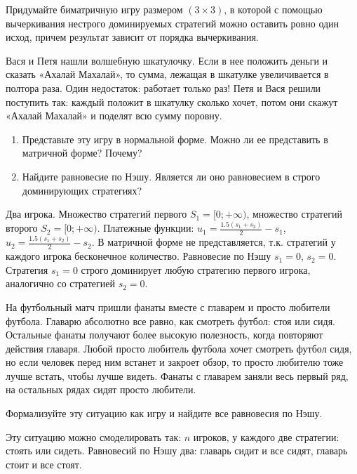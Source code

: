 \begin{problem}[Конструктор-3]
Придумайте биматричную игру размером  $\left(3\times 3\right)$, в которой с помощью вычеркивания нестрого доминируемых стратегий можно оставить ровно один исход, причем результат зависит от порядка вычеркивания.\par
\begin{sol}
\end{sol}
\end{problem}

\begin{problem}
Вася и Петя нашли волшебную шкатулочку. Если в нее положить деньги и сказать «Ахалай Махалай», то сумма, лежащая в шкатулке увеличивается в полтора раза. Один недостаток: работает только раз! Петя и Вася решили поступить так: каждый положит в шкатулку сколько хочет, потом они скажут «Ахалай Махалай» и поделят всю сумму поровну.\par
\begin{enumerate}
\item 	Представьте эту игру в нормальной форме. Можно ли ее представить в матричной форме? Почему?\par
\item 	Найдите равновесие по Нэшу. Является ли оно равновесием в строго доминирующих стратегиях?
\end{enumerate}



\begin{sol}
Два игрока. Множество стратегий первого $S_{1}=[0;+\infty)$, множество стратегий второго $S_{2}=[0;+\infty)$. Платежные функции: $u_{1}=\frac{1.5(s_{1}+s_{2})}{2}-s_{1}$,  $u_{2}=\frac{1.5(s_{1}+s_{2})}{2}-s_{2}$. В матричной форме не представляется, т.к. стратегий у каждого игрока бесконечное количество. Равновесие по Нэшу $s_{1}=0$, $s_{2}=0$. Стратегия $s_{1}=0$ строго доминирует любую стратегию первого игрока, аналогично со стратегией $s_{2}=0$.
\end{sol}
\end{problem}

\begin{problem}
На футбольный матч пришли фанаты вместе с главарем и просто любители футбола. Главарю абсолютно все равно, как смотреть футбол: стоя или сидя. Остальные фанаты получают более высокую полезность, когда повторяют действия главаря. Любой просто любитель футбола хочет смотреть футбол сидя, но если человек перед ним встанет и закроет обзор, то просто любителю тоже лучше встать, чтобы лучше видеть. Фанаты с главарем заняли весь первый ряд, на остальных рядах сидят просто любители.\par

Формализуйте эту ситуацию как игру и найдите все равновесия по Нэшу.

\begin{sol}
Эту ситуацию можно смоделировать так: $n$ игроков, у каждого две стратегии: стоять или сидеть. Равновесий по Нэшу два: главарь сидит и все сидят, главарь стоит и все стоят.
\end{sol}
\end{problem}



